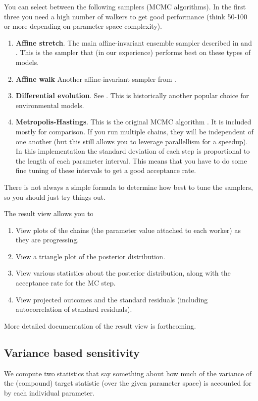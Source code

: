 \documentclass[11pt]{article}
\theoremstyle{definition}
\begin{document}
You can select between the following samplers (MCMC algorithms). In the first three you need a high number of walkers to get good performance (think 50-100 or more depending on parameter space complexity).
\begin{enumerate}
\item {\bf Affine stretch}. The main affine-invariant ensemble sampler described in \cite{goodman-weare10} and \cite{foreman-mackey-et-al13}. This is the sampler that (in our experience) performs best on these types of models. 
\item {\bf Affine walk} Another affine-invariant sampler from \cite{goodman-weare10}.
\item {\bf Differential evolution}. See \cite{ter-braak06}. This is historically another popular choice for environmental models.
\item {\bf Metropolis-Hastings}. This is the original MCMC algorithm \cite{hastings70}. It is included mostly for comparison. If you run multiple chains, they will be independent of one another (but this still allows you to leverage parallellism for a speedup). In this implementation the standard deviation of each step is proportional to the length of each parameter interval. This means that you have to do some fine tuning of these intervals to get a good acceptance rate.
\end{enumerate}
There is not always a simple formula to determine how best to tune the samplers, so you should just try things out.

The result view allows you to
\begin{enumerate}
\item View plots of the chains (the parameter value attached to each worker) as they are progressing.
\item View a triangle plot of the posterior distribution.
\item View various statistics about the posterior distribution, along with the acceptance rate for the MC step.
\item View projected outcomes and the standard residuals (including autocorrelation of standard residuals).
\end{enumerate}
More detailed documentation of the result view is forthcoming.

\subsection{Variance based sensitivity}
We compute two statistics that say something about how much of the variance of the (compound) target statistic (over the given parameter space) is accounted for by each individual parameter.
\end{document}
